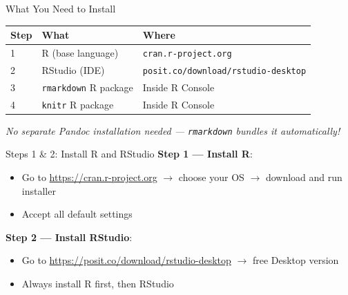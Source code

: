 \documentclass[dvipsnames,hyperref={pdfpagelabels=false}]{beamer}
\begin{document}
\begin{frame}{What You Need to Install}
  \begin{center}
    \begin{tabular}{lll}
      \toprule
      \textbf{Step} & \textbf{What} & \textbf{Where} \\
      \midrule
      1 & R (base language)      & \texttt{cran.r-project.org} \\
      2 & RStudio (IDE)          & \texttt{posit.co/download/rstudio-desktop} \\
      3 & \texttt{rmarkdown} R package & Inside R Console \\
      4 & \texttt{knitr} R package     & Inside R Console \\
      \bottomrule
    \end{tabular}
  \end{center}

  \vspace{1em}
  \textit{No separate Pandoc installation needed ---
  \texttt{rmarkdown} bundles it automatically!}
\end{frame}

\begin{frame}[fragile]{Steps 1 \& 2: Install R and RStudio}
  \textbf{Step 1 --- Install R}:
  \begin{itemize}
    \item Go to \url{https://cran.r-project.org} $\to$ choose your OS $\to$ download
          and run installer
    \item Accept all default settings
  \end{itemize}

  \vspace{0.8em}
  \textbf{Step 2 --- Install RStudio}:
  \begin{itemize}
    \item Go to \url{https://posit.co/download/rstudio-desktop} $\to$ free Desktop version
    \item \alert{Always install R first, then RStudio}
  \end{itemize}
\end{frame}
\end{document}
